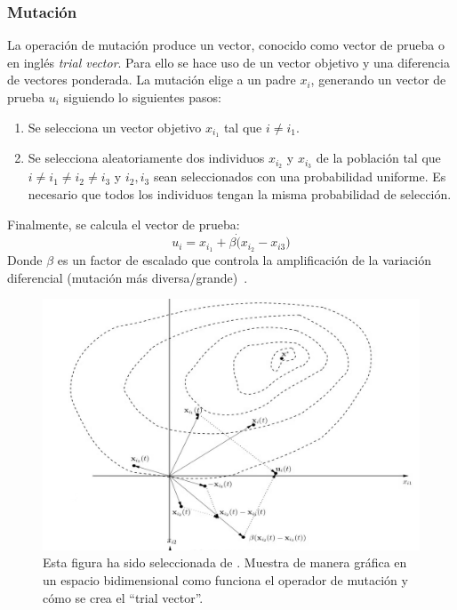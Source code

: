 \subsubsection{Mutación}
La operación de mutación produce un vector, conocido como vector de prueba o en inglés \textit{trial vector}. Para ello se hace uso de un vector objetivo y una diferencia de vectores ponderada. La mutación elige a un padre $x_{i}$, generando un vector de prueba $u_{i}$ siguiendo lo siguientes pasos:
\begin{enumerate}
    \item Se selecciona un vector objetivo $x_{i_1}$ tal que $i\neq i_1$.
    \item Se selecciona aleatoriamente dos individuos $x_{i_2}$ y $x_{i_3}$ de la población tal que $i\neq i_1\neq i_2\neq i_3$ y $i_2,i_3$ sean seleccionados con una probabilidad uniforme. Es necesario que todos los individuos tengan la misma probabilidad de selección.
\end{enumerate}
Finalmente, se calcula el vector de prueba:
\begin{equation}
    u_i = x_{i_1}+\beta\dot(x_{i_2}-x_{i3})
\end{equation}
Donde $\beta$ es un factor de escalado que controla la amplificación de la variación diferencial (mutación más diversa/grande)~\cite{storn_differential_1997}.

\begin{figure}[H]
    \begin{center}
        \includegraphics[width=1\textwidth]{imagenes/de-mutation.png}
    \end{center}
    \caption[Mutación en DE]{Esta figura ha sido seleccionada de \cite{10.5555/1557464}. Muestra de manera gráfica en un espacio bidimensional como funciona el operador de mutación y cómo se crea el ``trial vector''.}
\end{figure}

